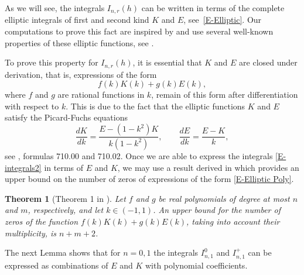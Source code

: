 \documentclass[12pt,psamsfonts]{amsart}
\newtheorem {theorem}{Theorem}[section]
\begin{document}
As we will see, the integrals $I_{n,r}(h)$ can be written in terms of the complete elliptic
integrals of first and second kind $K$ and $E$, see~\eqref{E-Elliptic}. Our computations to prove
this fact are inspired by \cite{Morozov1989} and use several well-known properties of
these elliptic functions, see \cite{Byrd,Gradshteyn1981}.

 To
prove this property for $I_{n,r}(h)$, it is essential that $K$
and $E$ are closed under derivation, that is,  expressions of the
form
\begin{equation}
\label{E-Elliptic Poly}
    f(k) K(k) + g(k) E(k),
\end{equation}
where $f$ and $g$ are rational functions in $k$, remain of this form
after differentiation with respect to $k$. This is due to the fact
that the elliptic functions $K$ and $E$ satisfy the
Picard-Fuchs equations
\begin{equation}
\label{E-Elliptic Diff}
    \frac{d K}{d k} = \frac{E-(1-k^2)K}{k(1-k^2)},\qquad
    \frac{d E}{d k} = \frac{E- K}{k},
\end{equation}
see \cite{Byrd},     formulas 710.00 and 710.02.
Once we are able to express the integrals \eqref{E-integrals2} in
terms of $E$ and $K$, we may use a result derived in
\cite{Gasull2002} which provides an upper bound on the number of
zeros of expressions of the form \eqref{E-Elliptic Poly}.

\begin{theorem}[Theorem 1 in \cite{Gasull2002}]
\label{T-thm Gasull Elliptic} Let $f$ and $g$ be real polynomials of
degree at most $n$ and $m$, respectively, and let $k\in(-1,1)$. An
upper bound for the number of zeros of the function $f(k) K(k) +
g(k) E(k)$, taking into account their multiplicity, is $n+m+2$.
\end{theorem}

The next Lemma shows that for $n=0,1$ the integrals $ I^0_{n,1}$ and $ I^+_{n,1}$ can be expressed
as combinations of $E$ and $K$ with polynomial coefficients.
\end{document}
